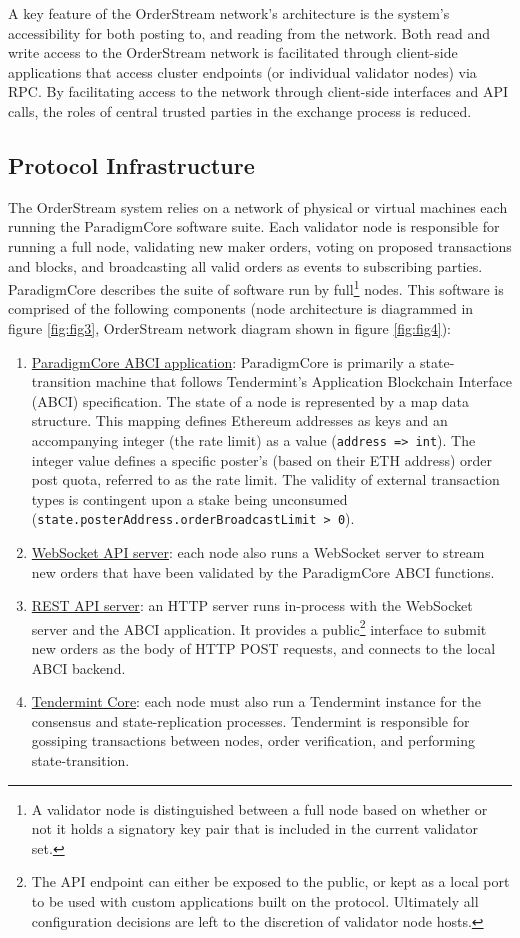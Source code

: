 \documentclass[9pt]{article}
\begin{document}
\noindent A key feature of the OrderStream network’s architecture is the system’s accessibility for both posting to, and reading from the network. Both read and write access to the OrderStream network is facilitated through client-side applications that access cluster endpoints (or individual validator nodes) via RPC. By facilitating access to the network through client-side interfaces and API calls, the roles of central trusted parties in the exchange process is reduced.

\subsection{Protocol Infrastructure}

\noindent The OrderStream system relies on a network of physical or virtual machines each running the ParadigmCore software suite. Each validator node is responsible for running a full node, validating new maker orders, voting on proposed transactions and blocks, and broadcasting all valid orders as events to subscribing parties. ParadigmCore describes the suite of software run by full\footnote{A validator node is distinguished between a full node based on whether or not it holds a signatory key pair that is included in the current validator set.} nodes. This software is comprised of the following components (node architecture is diagrammed in figure \ref{fig:fig3}, OrderStream network diagram shown in figure \ref{fig:fig4}):

\begin{enumerate}
\item \underline{ParadigmCore ABCI application}: ParadigmCore is primarily a state-transition machine that follows Tendermint’s Application Blockchain Interface (ABCI) specification. The state of a node is represented by a map data structure. This mapping defines Ethereum addresses as keys and an accompanying integer (the rate limit) as a value (\texttt{address => int}). The integer value defines a specific poster’s (based on their ETH address) order post quota, referred to as the rate limit. The validity of external transaction types is contingent upon a stake being unconsumed (\texttt{state.posterAddress.orderBroadcastLimit > 0}).
\item \underline{WebSocket API server}: each node also runs a WebSocket server to stream new orders that have been validated by the ParadigmCore ABCI functions.
\item \underline{REST API server}: an HTTP server runs in-process with the WebSocket server and the ABCI application. It provides a public\footnote{The API endpoint can either be exposed to the public, or kept as a local port to be used with custom applications built on the protocol. Ultimately all configuration decisions are left to the discretion of validator node hosts.} interface to submit new orders as the body of HTTP POST requests, and connects to the local ABCI backend.
\item \underline{Tendermint Core}: each node must also run a Tendermint instance for the consensus and state-replication processes. Tendermint is responsible for gossiping transactions between nodes, order verification, and performing state-transition.
\end{enumerate} 
\end{document}
